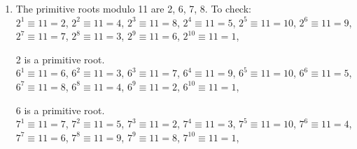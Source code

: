 {\begin{enumerate}
\begin{enumerate}[label=(\roman*)]
                        \(3^{17} \equiv 26\),
                        \(3^{18} \equiv 35\),
                        \(3^{19} \equiv 19\),
                        \(3^{20} \equiv 14\),
                        \(3^{21} \equiv 42\),
                        \(3^{22} \equiv 40\),
                        \(3^{23} \equiv 34\),
                        \(3^{24} \equiv 16\),
                        \(3^{25} \equiv 5\),
                        \(3^{26} \equiv 15\),
                        \(3^{27} \equiv 2\),
                        \(3^{28} \equiv 6\),
                        \(3^{29} \equiv 18\),
                        \(3^{30} \equiv 11\),
                        \(3^{31} \equiv 33\),
                        \(3^{32} \equiv 13\),
                        \(3^{33} \equiv 39\),
                        \(3^{34} \equiv 31\),
                        \(3^{35} \equiv 7\),
                        \(3^{36} \equiv 21\),
                        \(3^{37} \equiv 20\),
                        \(3^{38} \equiv 17\),
                        \(3^{39} \equiv 8\),
                        \(3^{40} \equiv 24\),
                        \(3^{41} \equiv 29\),
                        \(3^{42} \equiv 1\), \\
                        \(3\) is a primitive root.
              \end{enumerate}
        \item The primitive roots modulo 11 are 2, 6, 7, 8. To check: \\
              \(2^1 \equiv 11 = 2\),
              \(2^2 \equiv 11 = 4\),
              \(2^3 \equiv 11 = 8\),
              \(2^4 \equiv 11 = 5\),
              \(2^5 \equiv 11 = 10\),
              \(2^6 \equiv 11 = 9\),
              \(2^7 \equiv 11 = 7\),
              \(2^8 \equiv 11 = 3\),
              \(2^9 \equiv 11 = 6\),
              \(2^{10} \equiv 11 = 1\),

              2 is a primitive root. \\

              \(6^1 \equiv 11 = 6\),
              \(6^2 \equiv 11 = 3\),
              \(6^3 \equiv 11 = 7\),
              \(6^4 \equiv 11 = 9\),
              \(6^5 \equiv 11 = 10\),
              \(6^6 \equiv 11 = 5\),
              \(6^7 \equiv 11 = 8\),
              \(6^8 \equiv 11 = 4\),
              \(6^9 \equiv 11 = 2\),
              \(6^{10} \equiv 11 = 1\),

              6 is a primitive root. \\

              \(7^1 \equiv 11 = 7\),
              \(7^2 \equiv 11 = 5\),
              \(7^3 \equiv 11 = 2\),
              \(7^4 \equiv 11 = 3\),
              \(7^5 \equiv 11 = 10\),
              \(7^6 \equiv 11 = 4\),
              \(7^7 \equiv 11 = 6\),
              \(7^8 \equiv 11 = 9\),
              \(7^9 \equiv 11 = 8\),
              \(7^{10} \equiv 11 = 1\),


\end{enumerate}}
